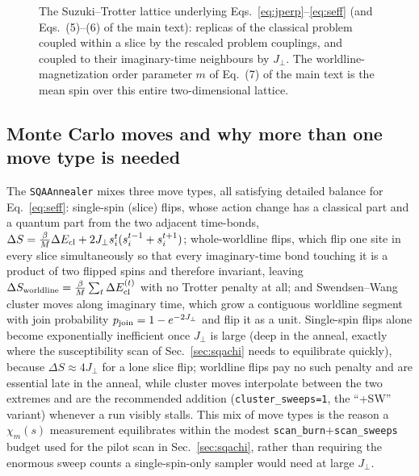 \documentclass[11pt]{article}
\newcommand{\chim}{\chi_{m}}
\begin{document}
\begin{figure}[h]
\centering
{}
\caption{The Suzuki--Trotter lattice underlying Eqs.~\eqref{eq:jperp}--\eqref{eq:seff} (and
Eqs.~(5)--(6) of the main text): replicas of the classical problem coupled within a slice by the
rescaled problem couplings, and coupled to their imaginary-time neighbours by $J_\perp$. The
worldline-magnetization order parameter $m$ of Eq.~(7) of the main text is the mean spin over
this entire two-dimensional lattice.}
\label{fig:trotter}
\end{figure}

\subsection{Monte Carlo moves and why more than one move type is needed}
The \texttt{SQAAnnealer} mixes three move types, all satisfying detailed balance for
Eq.~\eqref{eq:seff}: single-spin (slice) flips, whose action change has a classical part and a
quantum part from the two adjacent time-bonds, $\Delta S=\frac{\beta}{M}\Delta E_{\rm cl} +
2J_\perp s_i^t(s_i^{t-1}+s_i^{t+1})$; whole-worldline flips, which flip one site in every slice
simultaneously so that every imaginary-time bond touching it is a product of two flipped spins
and therefore invariant, leaving $\Delta S_{\rm worldline}=\frac{\beta}{M}\sum_t\Delta
E_{\rm cl}^{(t)}$ with no Trotter penalty at all; and Swendsen--Wang cluster moves along
imaginary time, which grow a contiguous worldline segment with join probability
$p_{\rm join}=1-e^{-2J_\perp}$ and flip it as a unit. Single-spin flips alone become
exponentially inefficient once $J_\perp$ is large (deep in the anneal, exactly where the
susceptibility scan of Sec.~\ref{sec:sqachi} needs to equilibrate quickly), because $\Delta S
\approx4J_\perp$ for a lone slice flip; worldline flips pay no such penalty and are essential
late in the anneal, while cluster moves interpolate between the two extremes and are the
recommended addition (\texttt{cluster\_sweeps=1}, the ``+SW'' variant) whenever a run visibly
stalls. This mix of move types is the reason a $\chim(s)$ measurement equilibrates within the
modest \texttt{scan\_burn}$+$\texttt{scan\_sweeps} budget used for the pilot scan in
Sec.~\ref{sec:sqachi}, rather than requiring the enormous sweep counts a single-spin-only sampler
would need at large $J_\perp$.
\end{document}
